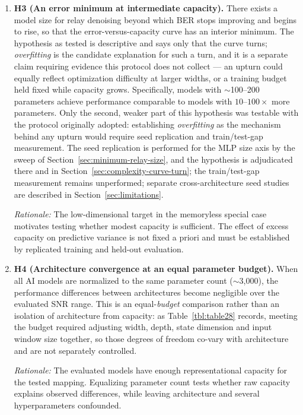\begin{enumerate}
\item \textbf{H3 (An error minimum at intermediate capacity).} There exists a model size for relay denoising beyond which BER stops improving and begins to rise, so that the error-versus-capacity curve has an interior minimum. The hypothesis as tested is descriptive and says only that the curve turns; \emph{overfitting} is the candidate explanation for such a turn, and it is a separate claim requiring evidence this protocol does not collect --- an upturn could equally reflect optimization difficulty at larger widths, or a training budget held fixed while capacity grows. Specifically, models with $\sim$100--200 parameters achieve performance comparable to models with $10$--$100\times$ more parameters. Only the second, weaker part of this hypothesis was testable with the protocol originally adopted: establishing \emph{overfitting} as the mechanism behind any upturn would require seed replication and train/test-gap measurement. The seed replication is performed for the MLP size axis by the sweep of Section~\ref{sec:minimum-relay-size}, and the hypothesis is adjudicated there and in Section~\ref{sec:complexity-curve-turn}; the train/test-gap measurement remains unperformed; separate cross-architecture seed studies are described in Section~\ref{sec:limitations}.

\emph{Rationale:} The low-dimensional target in the memoryless special case motivates testing whether modest capacity is sufficient. The effect of excess capacity on predictive variance is not fixed a priori and must be established by replicated training and held-out evaluation.

\item \textbf{H4 (Architecture convergence at an equal parameter budget).} When all AI models are normalized to the same parameter count ($\sim$3,000), the performance differences between architectures become negligible over the evaluated SNR range. This is an equal-\emph{budget} comparison rather than an isolation of architecture from capacity: as Table~\ref{tbl:table28} records, meeting the budget required adjusting width, depth, state dimension and input window size together, so those degrees of freedom co-vary with architecture and are not separately controlled.

\emph{Rationale:} The evaluated models have enough representational capacity for the tested mapping. Equalizing parameter count tests whether raw capacity explains observed differences, while leaving architecture and several hyperparameters confounded.

\end{enumerate}

